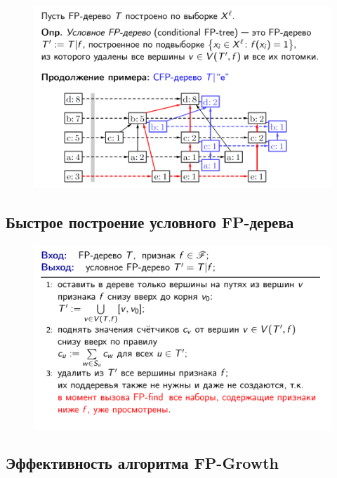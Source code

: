 \documentclass{beamer}
\begin{document}
\begin{frame}
	\begin{figure}[h]
		\centering
		\includegraphics[scale=0.45]{images/lec08-pic45.png}
	\end{figure}
\end{frame}

\subsection{Быстрое построение условного FP-дерева}

\begin{frame}
	\begin{figure}[h]
		\centering
		\includegraphics[scale=0.45]{images/lec08-pic46.png}
	\end{figure}
\end{frame}

\subsection{Эффективность алгоритма FP-Growth}
\end{document}
